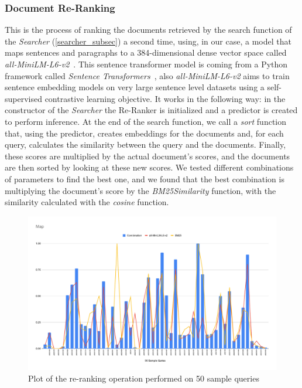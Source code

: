\subsubsection{Document Re-Ranking}
This is the process of ranking the documents retrieved by the search function of the \textit{Searcher} (\ref{searcher_subsec}) a second time, using, in our case, a model that maps sentences and paragraphs to a 384-dimensional dense vector space called \textit{all-MiniLM-L6-v2}~\cite{huggingfaceallminilml6v2}. This sentence transformer model is coming from a Python framework called \textit{Sentence Transformers}~\cite{sentence-transformers}, also \textit{all-MiniLM-L6-v2} aims to train sentence embedding models on very large sentence level datasets using a self-supervised contrastive learning objective.
\newline
It works in the following way: in the constructor of the \textit{Searcher} the Re-Ranker is initialized and a predictor is created to perform inference.
At the end of the search function, we call a \textit{sort} function that, using the predictor, creates embeddings for the documents and, for each query, calculates the similarity between the query and the documents.
Finally, these scores are multiplied by the actual document's scores, and the documents are then sorted by looking at these new scores.
\newline
We tested different combinations of parameters to find the best one, and we found that the best combination is multiplying the document's score by the \textit{BM25Similarity} function, with the similarity calculated with the \textit{cosine} function.
\begin{figure}[!ht]
    \centering
    \includegraphics[scale=0.45, keepaspectratio]{figure/re-ranking}
    \caption{Plot of the re-ranking operation performed on 50 sample queries}
    \label{fig:re-rankinge}
\end{figure}
